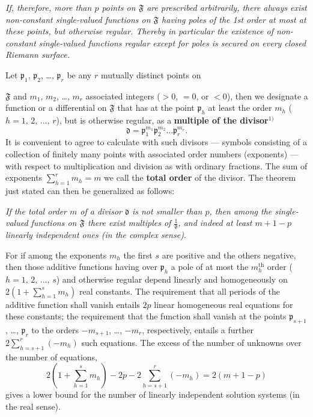 \documentclass{article}
\begin{document}
\emph{If, therefore, more than $p$ points on $\mathfrak{F}$ are prescribed arbitrarily, there always exist non-constant single-valued functions on $\mathfrak{F}$ having poles of the 1st order at most at these points, but otherwise regular. Thereby in particular the existence of non-constant single-valued functions regular except for poles is secured on every closed Riemann surface.}

Let $\mathfrak{p}_1$, $\mathfrak{p}_2$, \dots, $\mathfrak{p}_r$ be any $r$ mutually distinct points on

$\mathfrak{F}$ and $m_1$, $m_2$, \dots, $m_r$ associated integers ($> 0$, $= 0$, or $< 0$), then we designate a function or a differential on $\mathfrak{F}$ that has at the point $\mathfrak{p}_h$ at least the order $m_h$ ($h = 1, \, 2, \, \dots, \, r$), but is otherwise regular, as a \textbf{multiple of the divisor}${}^{1)}$
\[ \mathfrak{d} = \mathfrak{p}_1^{m_1} \mathfrak{p}_2^{m_2} \dots \mathfrak{p}_r^{m_r}. \]
It is convenient to agree to calculate with such divisors --- symbols consisting of a collection of finitely many points with associated order numbers (exponents) --- with respect to multiplication and division as with ordinary fractions. The sum of exponents $\displaystyle\sum_{h=1}^r m_h = m$ we call the \textbf{total order} of the divisor. The theorem just stated can then be generalized as follows:

\emph{If the total order $m$ of a divisor $\mathfrak{d}$ is not smaller than $p$, then among the single-valued functions on $\mathfrak{F}$ there exist multiples of $\frac{1}{\mathfrak{d}}$, and indeed at least $m + 1 - p$ linearly independent ones (in the complex sense).}

For if among the exponents $m_h$ the first $s$ are positive and the others negative, then those additive functions having over $\mathfrak{p}_h$ a pole of at most the $m_h^{\text{th}}$ order ($h = 1, \, 2, \, \dots, \, s$) and otherwise regular depend linearly and homogeneously on $2\left(1 + \displaystyle\sum_{h=1}^s m_h\right)$ real constants. The requirement that all periods of the additive function shall vanish entails $2p$ linear homogeneous real equations for these constants; the requirement that the function shall vanish at the points $\mathfrak{p}_{s+1}$, \dots, $\mathfrak{p}_r$ to the orders $-m_{s+1}$, \dots, $-m_r$, respectively, entails a further $2\displaystyle\sum_{h=s+1}^r (-m_h)$ such equations. The excess of the number of unknowns over the number of equations,
\[ 2\left(1 + \sum_{h=1}^s m_h\right) - 2p - 2\sum_{h=s+1}^r (-m_h) = 2(m + 1 - p) \]
gives a lower bound for the number of linearly independent solution systems (in the real sense).
\end{document}
